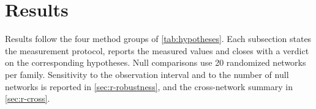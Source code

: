 \section{Results}\label{sec:results}
Results follow the four method groups of \cref{tab:hypotheses}. Each subsection states the
measurement protocol, reports the measured values and closes with a verdict on the
corresponding hypotheses. Null comparisons use 20 randomized networks per family.
Sensitivity to the observation interval and to the number of null networks is reported in
\cref{sec:r-robustness}, and the cross-network summary in \cref{sec:r-cross}.






